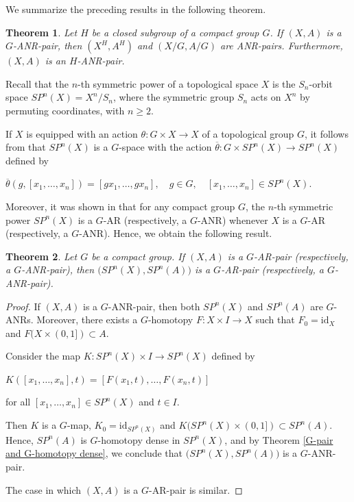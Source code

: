 \documentclass[12pt]{amsart}
\newtheorem{theorem}{Theorem}[section]
\theoremstyle{definition}
\begin{document}
	We summarize the preceding results in the following theorem.
	
	\begin{theorem}\label{condicionesGhomotopydense}
		\rm{Let $H$ be a closed subgroup of a compact group $G$. If $(X,A)$ is a $G$-ANR-pair, then $(X^H,A^H)$ and $(X/G,A/G)$ are ANR-pairs. Furthermore, $(X,A)$ is an $H$-ANR-pair.}
	\end{theorem}
	
	Recall that the $n$-th symmetric power of a topological space $X$ is the $S_n$-orbit space $SP^n(X)=X^n/S_n$, where the symmetric group $S_n$ acts on $X^n$ by permuting coordinates, with $n\geq 2$.
	
	If $X$ is equipped with an action $\theta:G\times X\rightarrow X$ of a topological group $G$, it follows from \cite{HJ1} that $SP^n(X)$ is a $G$-space with the action $\overline{\theta}: G\times SP^n(X)\rightarrow SP^n(X)$ defined by
	\begin{center}
		$\overline{\theta}(g,[x_1,\dots,x_n])=[gx_1,\dots,gx_n],\quad g\in G,\quad [x_1,\dots,x_n]\in SP^n(X)$.
	\end{center}
	
	Moreover, it was shown in \cite[Theorem 4.2]{HJ1} that for any compact group $G$, the $n$-th symmetric power $SP^n(X)$ is a $G$-AR (respectively, a $G$-ANR) whenever $X$ is a $G$-AR (respectively, a $G$-ANR). Hence, we obtain the following result.
	
	\begin{theorem}\label{npower}
		\rm{Let $G$ be a compact group. If $(X,A)$ is a $G$-AR-pair (respectively, a $G$-ANR-pair), then $\big(SP^n(X),SP^n(A)\big)$ is a $G$-AR-pair (respectively, a $G$-ANR-pair).}
	\end{theorem}
	
	\begin{proof}
		If $(X,A)$ is a $G$-ANR-pair, then both $SP^n(X)$ and $SP^n(A)$ are $G$-ANRs. Moreover, there exists a $G$-homotopy $F:X\times I\rightarrow X$ such that $F_0=\mathrm{id}_X$ and $F(X\times(0,1])\subset A$.
		
		Consider the map $K: SP^n(X)\times I\rightarrow SP^n(X)$ defined by
		\begin{center}
			$K([x_1,\dots,x_n],t)=[F(x_1,t),\dots,F(x_n,t)]$
		\end{center}
		for all $[x_1,\dots,x_n]\in SP^n(X)$ and $ t\in I$.
		
		Then $K$ is a $G$-map, $K_0=\mathrm{id}_{SP^n(X)}$ and $K(SP^n(X)\times (0,1])\subset SP^n(A)$. Hence, $SP^n(A)$ is $G$-homotopy dense in $SP^n(X)$, and by Theorem \ref{G-pair and G-homotopy dense}, we conclude that $\big(SP^n(X),SP^n(A)\big)$ is a $G$-ANR-pair.
		
		The case in which $(X,A)$ is a $G$-AR-pair is similar.
	\end{proof}
	
\end{document}
